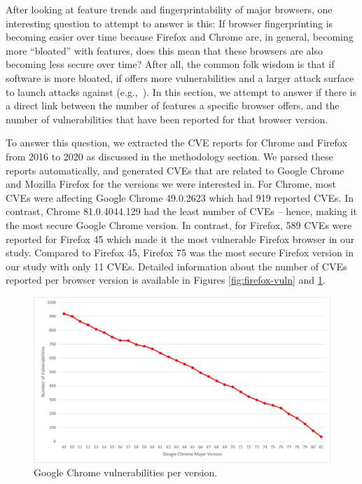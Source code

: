 After looking at feature trends and fingerprintability of major
browsers, one interesting question to attempt to answer is this: If
browser fingerprinting is becoming easier over time because Firefox
and Chrome are, in general, becoming more ``bloated'' with features,
does this mean that these browsers are also becoming less secure over
time?  After all, the common folk wisdom is that if software is more
bloated, if offers more vulnerabilities and a larger attack surface to
launch attacks against (e.g.,~\cite{Bloating}). In this section, we
attempt to answer if there is a direct link between the number of
features a specific browser offers, and the number of vulnerabilities
that have been reported for that browser version.

To answer this question, we extracted the CVE reports for Chrome and
Firefox from 2016 to 2020 as discussed in the methodology section. We
parsed these reports automatically, and generated CVEs that are
related to Google Chrome and Mozilla Firefox for the versions we were
interested in. For Chrome, most CVEs were affecting Google Chrome
49.0.2623 which had 919 reported CVEs. In contrast, Chrome
81.0.4044.129 had the least number of CVEs -- hence, making it the
most secure Google Chrome version. In contrast, for Firefox, 589 CVEs
were reported for Firefox 45 which made it the most vulnerable Firefox
browser in our study. Compared to Firefox 45, Firefox 75 was the most
secure Firefox version in our study with only 11 CVEs. Detailed
information about the number of CVEs reported per browser version is
available in Figures \ref{fig:firefox-vuln} and \ref{fig:chrome-vuln}.

\begin{figure}[ht]
    \centering
    \includegraphics[width=\columnwidth]{figures/Chrome-Vulnerabilities.png}
    \caption{Google Chrome vulnerabilities per version.}
    \label{fig:chrome-vuln}
\end{figure}

